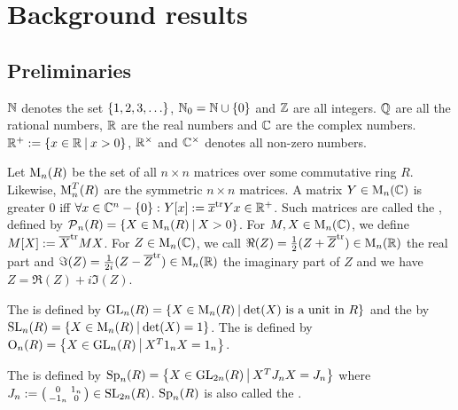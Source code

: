 
\section{Background results}

\subsection{Preliminaries}

$\mathbb{N}$ denotes the set $\Set{1,2,3,\dots}$, $\N_0 = \N \cup \Set{0}$ and $\mathbb{Z}$ are all integers. $\mathbb{Q}$ are all the rational numbers, $\mathbb{R}$ are the real numbers and $\mathbb{C}$ are the complex numbers. $\R^+ := \Set{x\in\R}{x>0}$, $\mathbb{R}^\times$ and $\mathbb{C}^\times$ denotes all non-zero numbers.

Let $\operatorname{M}_n(R)$ be the set of all $n \times n$ matrices over some commutative ring $R$.
Likewise, $\operatorname{M}_n^T(R)$ are the symmetric $n \times n$ matrices.
A matrix $Y \in \operatorname{M}_n(\mathbb{C})$ is greater $0$ iff $\forall x \in \C^n - \Set{0} \colon Y[x] := \overline{x}^{\tr} Y x \in \R^+$. Such matrices are called the , defined by $\PM_n(R) = \Set{X \in \M_n(R)}{X > 0}$. For $M,X \in \operatorname{M}_n(\mathbb{C})$, we define $M[X] := \overline{X}^{\textup{\textrm{tr}}} M X$. For $Z \in \operatorname{M}_n(\mathbb{C})$, we call $\Re(Z) = \frac{1}{2} (Z + \overline{Z}^{\textup{\textrm{tr}}}) \in \operatorname{M}_n(\mathbb{R})$ the real part and $\Im(Z) = \frac{1}{2i} (Z - \overline{Z}^{\textup{\textrm{tr}}})  \in \operatorname{M}_n(\mathbb{R})$ the imaginary part of $Z$ and we have $Z = \Re(Z) + i \Im(Z)$.

The  is defined by $\GL_n(R) = \Set{X \in \M_n(R)}{\text{$\det(X)$ is a unit in $R$}}$
and the  by $\SL_n(R) = \Set{X \in \M_n(R)}{\det(X) = 1}$. %
The  is defined by $\Orth_n(R) = \Set{X \in \GL_n(R)}{X^T 1_n X = 1_n}$. %

The  is defined by $\Sp_n(R) = \Set{X \in \GL_{2n}(R)}{X^T J_n X = J_n}$ %
where $J_n := \left( \begin{smallmatrix} 0 & 1_n \\ -1_n & 0 \end{smallmatrix} \right) \in \operatorname{SL}_{2n}(R)$. %
$\operatorname{Sp}_n(R)$ is also called the .


